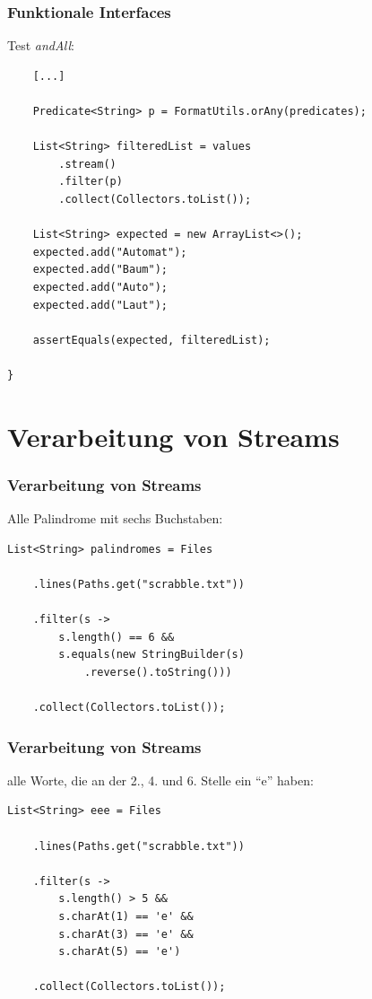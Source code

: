 \documentclass{beamer}
\begin{document}
\begin{frame}[fragile]
\frametitle{Funktionale Interfaces}

Test \textit{andAll}:

\lstset{basicstyle=\scriptsize}
\begin{lstlisting}
    [...]

    Predicate<String> p = FormatUtils.orAny(predicates);

    List<String> filteredList = values
        .stream()
        .filter(p)
        .collect(Collectors.toList());

    List<String> expected = new ArrayList<>();
    expected.add("Automat");
    expected.add("Baum");
    expected.add("Auto");
    expected.add("Laut");

    assertEquals(expected, filteredList);

}
\end{lstlisting}

\end{frame}


\section{Verarbeitung von Streams}
\begin{frame}[fragile]
\frametitle{Verarbeitung von Streams}

Alle Palindrome mit sechs Buchstaben:

\lstset{basicstyle=\footnotesize}
\begin{lstlisting}
List<String> palindromes = Files

    .lines(Paths.get("scrabble.txt"))

    .filter(s -> 
        s.length() == 6 && 
        s.equals(new StringBuilder(s)
            .reverse().toString()))

    .collect(Collectors.toList());
\end{lstlisting}

\end{frame}

\begin{frame}[fragile]
\frametitle{Verarbeitung von Streams}

alle Worte, die an der 2., 4. und 6. Stelle ein ``e'' haben:

\begin{lstlisting}
List<String> eee = Files

    .lines(Paths.get("scrabble.txt"))

    .filter(s -> 
        s.length() > 5 && 
        s.charAt(1) == 'e' && 
        s.charAt(3) == 'e' && 
        s.charAt(5) == 'e')

    .collect(Collectors.toList());
\end{lstlisting}

\end{frame}
\end{document}
